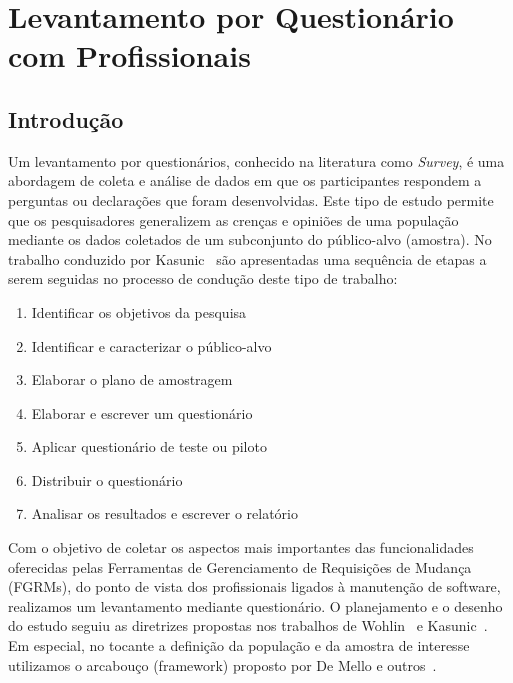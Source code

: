 \chapter{Levantamento por Questionário com Profissionais}
\label{ch:pesquisa-profissionais}

\section{Introdução}
\label{sec:pesquisa-profissionais-intro}

Um levantamento por questionários, conhecido na literatura como \textit{Survey},
é uma abordagem de coleta e análise de dados em que os participantes respondem a
perguntas ou declarações que foram desenvolvidas. Este tipo de estudo permite
que os pesquisadores generalizem as crenças e opiniões de uma população mediante
os dados coletados de um subconjunto do público-alvo (amostra). No trabalho
conduzido por Kasunic~\cite{kasunic2005designing} são apresentadas uma sequência
de etapas a serem seguidas no processo de condução deste tipo de trabalho:

\begin{enumerate}
\item{Identificar os objetivos da pesquisa}
\item{Identificar e caracterizar o público-alvo}
\item{Elaborar o plano de amostragem}
\item{Elaborar e escrever um questionário}
\item{Aplicar questionário de teste ou piloto}
\item{Distribuir o questionário}
\item{Analisar os resultados e escrever o relatório}
\end{enumerate}

Com o objetivo de coletar os aspectos mais importantes das funcionalidades
oferecidas pelas Ferramentas de Gerenciamento de Requisições de Mudança (FGRMs),
do ponto de vista dos profissionais ligados à manutenção de software, realizamos
um levantamento mediante questionário. O planejamento e o desenho do estudo
seguiu as diretrizes propostas nos trabalhos de
Wohlin~\cite{wohlin2012experimentation} e Kasunic~\cite{kasunic2005designing}.
Em especial, no tocante a definição da população e da amostra de interesse
utilizamos o arcabouço (framework) proposto por De Mello e
outros~\cite{de2015investigating, de2014towards}.


